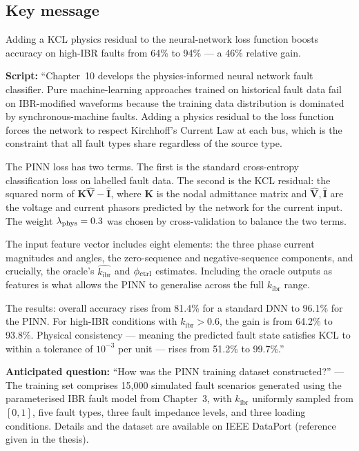 \documentclass[11pt,a4paper]{article}
\newcommand{\script}[1]{\begin{scriptbox}\textbf{Script:} #1\end{scriptbox}}
\newcommand{\anticipate}[1]{\begin{warnbox}\textbf{Anticipated question:} #1\end{warnbox}}
\newcommand{\kibr}{k_{\mathrm{ibr}}}
\begin{document}
\subsection*{Key message}
Adding a KCL physics residual to the neural-network loss function boosts accuracy on
high-IBR faults from 64\% to 94\% --- a 46\% relative gain.

\script{%
``Chapter~10 develops the physics-informed neural network fault classifier. Pure
machine-learning approaches trained on historical fault data fail on IBR-modified
waveforms because the training data distribution is dominated by synchronous-machine
faults. Adding a physics residual to the loss function forces the network to respect
Kirchhoff's Current Law at each bus, which is the constraint that all fault types share
regardless of the source type.

The PINN loss has two terms. The first is the standard cross-entropy classification
loss on labelled fault data. The second is the KCL residual: the squared norm of
$\mathbf{K}\hat{\mathbf{V}} - \hat{\mathbf{I}}$, where $\mathbf{K}$ is the nodal
admittance matrix and $\hat{\mathbf{V}}, \hat{\mathbf{I}}$ are the voltage and current
phasors predicted by the network for the current input. The weight $\lambda_{\rm phys} = 0.3$
was chosen by cross-validation to balance the two terms.

The input feature vector includes eight elements: the three phase current magnitudes and
angles, the zero-sequence and negative-sequence components, and crucially, the oracle's
$\hat{\kibr}$ and $\phi_{\rm ctrl}$ estimates. Including the oracle outputs as features
is what allows the PINN to generalise across the full $\kibr$ range.

The results: overall accuracy rises from 81.4\% for a standard DNN to 96.1\% for the
PINN. For high-IBR conditions with $\kibr > 0.6$, the gain is from 64.2\% to 93.8\%.
Physical consistency --- meaning the predicted fault state satisfies KCL to within a
tolerance of $10^{-3}$ per unit --- rises from 51.2\% to 99.7\%.''%
}

\anticipate{``How was the PINN training dataset constructed?'' ---
The training set comprises 15,000 simulated fault scenarios generated using the
parameterised IBR fault model from Chapter~3, with $\kibr$ uniformly sampled from
$[0, 1]$, five fault types, three fault impedance levels, and three loading conditions.
Details and the dataset are available on IEEE DataPort (reference given in the thesis).}

\end{document}
